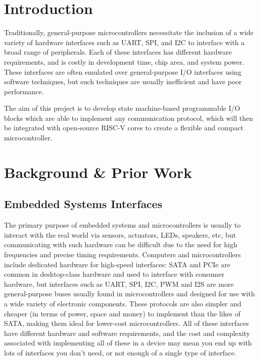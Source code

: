 \documentclass[a4paper,fleqn,12pt]{article}
\begin{document}


\pagestyle{plain}

\section{Introduction}

Traditionally, general-purpose microcontrollers necessitate the inclusion of a wide variety of hardware interfaces such as UART, SPI, and I2C to interface with a broad range of peripherals. Each of these interfaces has different hardware requirements, and is costly in development time, chip area, and system power. These interfaces are often emulated over general-purpose I/O interfaces using software techniques, but such techniques are usually inefficient and have poor performance.

The aim of this project is to develop state machine-based programmable I/O blocks which are able to implement any communication protocol, which will then be integrated with open-source RISC-V cores to create a flexible and compact microcontroller.

\section{Background \& Prior Work}

\subsection{Embedded Systems Interfaces}

The primary purpose of embedded systems and microcontrollers is usually to interact with the real world via sensors, actuators, LEDs, speakers, etc, but communicating with such hardware can be difficult due to the need for high frequencies and precise timing requirements. Computers and microcontrollers include dedicated hardware for high-speed interfaces: SATA and PCIe are common in desktop-class hardware and used to interface with consumer hardware, but interfaces such as UART, SPI, I2C, PWM and I2S are more general-purpose buses usually found in microcontrollers and designed for use with a wide variety of electronic components. These protocols are also simpler and cheaper (in terms of power, space and money) to implement than the likes of SATA, making them ideal for lower-cost microcontrollers. All of these interfaces have different hardware and software requirements, and the cost and complexity associated with implementing all of these in a device may mean you end up with lots of interfaces you don't need, or not enough of a single type of interface.
\end{document}
